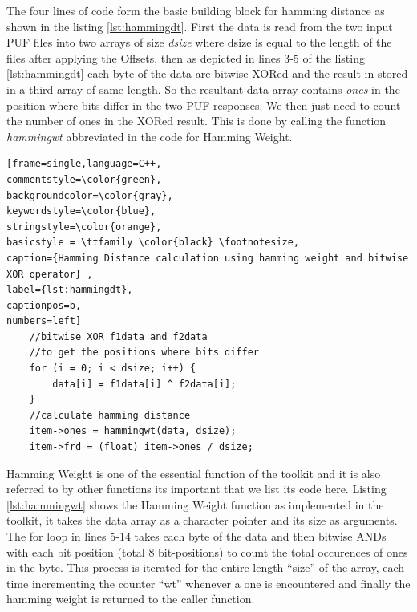 The four lines of code form the basic building block for hamming distance as shown in the listing \ref{lst:hammingdt}. First the data is read from the two input PUF files into two arrays of size \emph{dsize} where dsize is equal to the length of the files after applying the Offsets, then as depicted in lines 3-5 of the listing \ref{lst:hammingdt} each byte of the data are bitwise XORed and the result in stored in a third array of same length. So the resultant data array contains
\emph{ones} in the position where bits differ in the two PUF responses. We then just need to count the number of ones in the XORed result.
This is done by calling the function \emph{hammingwt} abbreviated in the code for Hamming Weight.\\

\begin{center}
\begin{minipage}{0.7\textwidth}
\begin{lstlisting}[frame=single,language=C++,
commentstyle=\color{green},
backgroundcolor=\color{gray},
keywordstyle=\color{blue},
stringstyle=\color{orange},
basicstyle = \ttfamily \color{black} \footnotesize,
caption={Hamming Distance calculation using hamming weight and bitwise XOR operator} ,
label={lst:hammingdt},
captionpos=b,
numbers=left]
    //bitwise XOR f1data and f2data
    //to get the positions where bits differ
    for (i = 0; i < dsize; i++) {
        data[i] = f1data[i] ^ f2data[i];
    }
    //calculate hamming distance
    item->ones = hammingwt(data, dsize);
    item->frd = (float) item->ones / dsize;
\end{lstlisting}
\end{minipage}
\end{center}

Hamming Weight is one of the essential function of the toolkit and it is also referred to by other functions its important that we list its code here. Listing \ref{lst:hammingwt} shows the Hamming Weight function as implemented in the toolkit, it takes the data array as a character pointer and its size as arguments. The for loop in lines 5-14 takes each byte of the data and then bitwise ANDs with each bit position (total 8 bit-positions) to count the total occurences of ones in the byte. This process is
iterated for the entire length ``size'' of the array, each time incrementing the counter ``wt'' whenever a one is encountered and finally the hamming weight is returned to the caller function.\\


